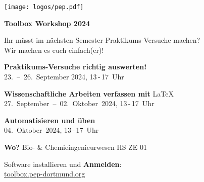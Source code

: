 \documentclass[paper=landscape]{scrartcl}
\begin{document}
  \begin{minipage}{0.25\textwidth}%
    \texttt{[image: logos/pep.pdf]}%
  \end{minipage}%
  \begin{minipage}{0.75\textwidth}%
    \centering\fontsize{50}{60}\bfseries\selectfont Toolbox Workshop 2024%
  \end{minipage}%

  \vspace{0.3cm}

  \begin{center}
    \Huge Ihr müsst im nächsten Semester Praktikums-Versuche machen? \\[0.3\baselineskip]
    Wir machen es euch einfach(er)!
  \end{center}

 \vspace{0.1cm}

  \begin{center}
    \huge \textbf{Praktikums-Versuche richtig auswerten!} \\[0.3\baselineskip]
    23.~–~26.~September 2024, 13\,-\,17~Uhr
  \end{center}
  \vspace{0.1cm}
  \begin{center}
    \huge \textbf{Wissenschaftliche Arbeiten verfassen mit} \textrm{\LaTeX}\\[0.3\baselineskip]
    27.~September~–~02.~Oktober~2024, 13\,-\,17~Uhr
  \end{center}
  \vspace{0.1cm}
  \begin{center}
    \huge \textbf{Automatisieren und üben}\\[0.3\baselineskip]
    04.~Oktober~2024, 13\,-\,17~Uhr
  \end{center}
  \vspace{0.1cm}
  \begin{center}
    \huge \textbf{Wo?}
    Bio- \& Chemieingenieurwesen HS ZE 01 %
  \end{center}
  \vspace{0.1cm}
  \begin{center}
    \large Software installieren und \textbf{Anmelden}: \\
    \Huge \href{https://toolbox.pep-dortmund.org}{toolbox.pep-dortmund.org}
  \end{center}
\end{document}
